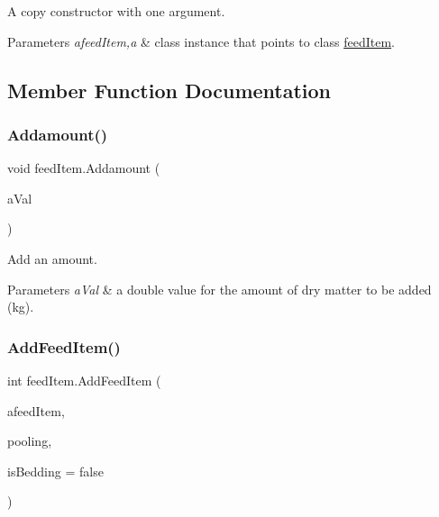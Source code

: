 A copy constructor with one argument. 


\begin{DoxyParams}{Parameters}
{\em afeed\+Item,a} & class instance that points to class \mbox{\hyperlink{classfeed_item}{feed\+Item}}. \\
\hline
\end{DoxyParams}


\subsection{Member Function Documentation}
\mbox{\label{classfeed_item_a7b662aa8b1ac382a6c2e27e45ca486bd}} 
\subsubsection{\texorpdfstring{Addamount()}{Addamount()}}
{\footnotesize\ttfamily void feed\+Item.\+Addamount (\begin{DoxyParamCaption}\item[{double}]{a\+Val }\end{DoxyParamCaption})\hspace{0.3cm}{\ttfamily [inline]}}



Add an amount. 


\begin{DoxyParams}{Parameters}
{\em a\+Val} & a double value for the amount of dry matter to be added (kg). \\
\hline
\end{DoxyParams}
\mbox{\label{classfeed_item_a9d4d5c145e4196c035034388e8d0a9a4}} 
\subsubsection{\texorpdfstring{AddFeedItem()}{AddFeedItem()}}
{\footnotesize\ttfamily int feed\+Item.\+Add\+Feed\+Item (\begin{DoxyParamCaption}\item[{\mbox{\hyperlink{classfeed_item}{feed\+Item}}}]{afeed\+Item,  }\item[{bool}]{pooling,  }\item[{bool}]{is\+Bedding = {\ttfamily false} }\end{DoxyParamCaption})\hspace{0.3cm}{\ttfamily [inline]}}



